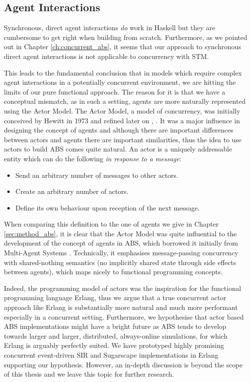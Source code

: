 \subsection{Agent Interactions}
Synchronous, direct agent interactions \textit{do} work in Haskell but they are cumbersome to get right when building from scratch. Furthermore, as we pointed out in Chapter \ref{ch:concurrent_abs}, it seems that our approach to synchronous direct agent interactions is not applicable to concurrency with STM. 

This leads to the fundamental conclusion that in models which require complex agent interactions in a potentially concurrent environment, we are hitting the limits of our pure functional approach. The reason for it is that we have a conceptual mismatch, as in such a setting, agents are more naturally represented using the Actor Model. The Actor Model, a model of concurrency, was initially conceived by Hewitt in 1973 \cite{hewitt_universal_1973} and refined later on \cite{hewitt_what_2007}, \cite{hewitt_actor_2010}. It was a major influence in designing the concept of agents and although there are important differences between actors and agents there are important similarities, thus the idea to use actors to build ABS comes quite natural.
An actor is a uniquely addressable entity which can do the following \textit{in response to a message}:
\begin{itemize}
	\item Send an arbitrary number of messages to other actors.
	\item Create an arbitrary number of actors.
	\item Define its own behaviour upon reception of the next message.
\end{itemize}

When comparing this definition to the one of agents we give in Chapter \ref{sec:method_abs}, it is clear that the Actor Model was quite influential to the development of the concept of agents in ABS, which borrowed it initially from Multi-Agent Systems \cite{wooldridge_introduction_2009}. Technically, it emphasises message-passing concurrency with shared-nothing semantics (no implicitly shared state through side effects between agents), which maps nicely to functional programming concepts.

Indeed, the programming model of actors \cite{agha_actors:_1986} was the inspiration for the functional programming language Erlang, thus we argue that a true concurrent actor approach like Erlang is substantially more natural and much more performant especially in a concurrent setting. Furthermore, we hypothesise that actor based ABS implementations might have a bright future as ABS tends to develop towards larger and larger, distributed, always-online simulations, for which Erlang is arguably perfectly suited. We have prototyped highly promising concurrent event-driven SIR and Sugarscape implementations in Erlang supporting our hypothesis. However, an in-depth discussion is beyond the scope of this thesis and we leave this topic for further research.

